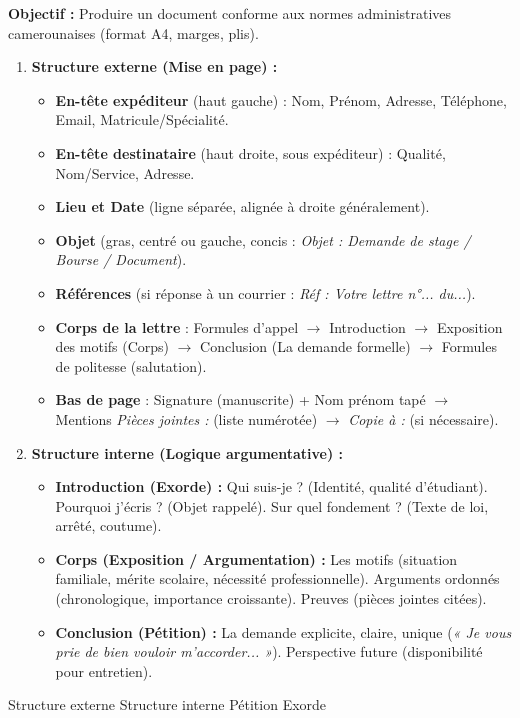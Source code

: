 \documentclass[11pt]{article}
\newcommand{\cle}[1]{{\popxbold\color{popdark}#1}}
\begin{document}
\begin{methode}
\textbf{Objectif :} Produire un document conforme aux normes administratives camerounaises (format A4, marges, plis).
\begin{enumerate}
    \item \textbf{Structure externe (Mise en page) :}
    \begin{itemize}
        \item \textbf{En-tête expéditeur} (haut gauche) : Nom, Prénom, Adresse, Téléphone, Email, Matricule/Spécialité.
        \item \textbf{En-tête destinataire} (haut droite, sous expéditeur) : Qualité, Nom/Service, Adresse.
        \item \textbf{Lieu et Date} (ligne séparée, alignée à droite généralement).
        \item \textbf{Objet} (gras, centré ou gauche, concis : \emph{Objet : Demande de stage / Bourse / Document}).
        \item \textbf{Références} (si réponse à un courrier : \emph{Réf : Votre lettre n°... du...}).
        \item \textbf{Corps de la lettre} : Formules d'appel $\rightarrow$ Introduction $\rightarrow$ Exposition des motifs (Corps) $\rightarrow$ Conclusion (La demande formelle) $\rightarrow$ Formules de politesse (salutation).
        \item \textbf{Bas de page} : Signature (manuscrite) + Nom prénom tapé $\rightarrow$ Mentions \emph{Pièces jointes :} (liste numérotée) $\rightarrow$ \emph{Copie à :} (si nécessaire).
    \end{itemize}
    \item \textbf{Structure interne (Logique argumentative) :}
    \begin{itemize}
        \item \textbf{Introduction (Exorde) :} Qui suis-je ? (Identité, qualité d'étudiant). Pourquoi j'écris ? (Objet rappelé). Sur quel fondement ? (Texte de loi, arrêté, coutume).
        \item \textbf{Corps (Exposition / Argumentation) :} Les motifs (situation familiale, mérite scolaire, nécessité professionnelle). Arguments ordonnés (chronologique, importance croissante). Preuves (pièces jointes citées).
        \item \textbf{Conclusion (Pétition) :} La demande explicite, claire, unique (\emph{« Je vous prie de bien vouloir m'accorder... »}). Perspective future (disponibilité pour entretien).
    \end{itemize}
\end{enumerate}
\cle{Structure externe} \cle{Structure interne} \cle{Pétition} \cle{Exorde}
\end{methode}
\end{document}
